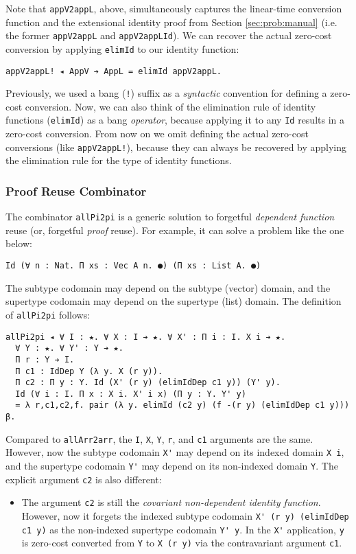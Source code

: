 \documentclass[acmsmall,screen]{acmart}
\newcommand{\refsec}[1]{Section \ref{sec:#1}}
\begin{document}
Note that \verb;appV2appL;, above, simultaneously captures the
linear-time conversion function and the extensional identity proof
from \refsec{prob:manual}
(i.e. the former \verb;appV2appL; and \verb;appV2appLId;).
We can recover the actual zero-cost
conversion by applying \verb;elimId; to our identity function:
\begin{verbatim}
appV2appL! ◂ AppV ➔ AppL = elimId appV2appL.
\end{verbatim}
Previously, we used a bang (\verb;!;) suffix as a \textit{syntactic} convention for
defining a zero-cost conversion. Now, we can also think of the elimination
rule of identity functions (\verb;elimId;) as a bang
\textit{operator}, because applying it to any \verb;Id; results in a
zero-cost conversion. From now on we omit defining the actual
zero-cost conversions (like \verb;appV2appL!;), because they can always
be recovered by applying the elimination rule for the type of identity
functions.

\subsubsection{Proof Reuse Combinator}

The combinator \verb;allPi2pi; is a generic solution to forgetful
\textit{dependent function} reuse (or, forgetful \textit{proof} reuse). For
example, it can solve a problem like the one below:
\begin{verbatim}
Id (∀ n : Nat. Π xs : Vec A n. ●) (Π xs : List A. ●)
\end{verbatim}
The subtype codomain may depend on the subtype (vector) domain, and
the supertype codomain may depend on the supertype (list) domain.
The definition of \verb;allPi2pi; follows:
\begin{verbatim}
allPi2pi ◂ ∀ I : ★. ∀ X : I ➔ ★. ∀ X' : Π i : I. X i ➔ ★. 
  ∀ Y : ★. ∀ Y' : Y ➔ ★.
  Π r : Y ➔ I.
  Π c1 : IdDep Y (λ y. X (r y)).
  Π c2 : Π y : Y. Id (X' (r y) (elimIdDep c1 y)) (Y' y).
  Id (∀ i : I. Π x : X i. X' i x) (Π y : Y. Y' y)
  = λ r,c1,c2,f. pair (λ y. elimId (c2 y) (f -(r y) (elimIdDep c1 y))) β.
\end{verbatim}
Compared to \verb;allArr2arr;, the \verb;I;, \verb;X;, \verb;Y;,
\verb;r;, and \verb;c1; arguments are the same. However, now the
subtype codomain \verb;X'; may depend on its indexed domain
\verb;X i;, and the supertype codomain \verb;Y'; may depend on its
non-indexed domain \verb;Y;. The explicit argument \verb;c2; is also
different:

\begin{itemize}
\item The argument \verb;c2; is still the \textit{covariant
  non-dependent identity function}. However, now it forgets the
  indexed subtype codomain \verb;X' (r y) (elimIdDep c1 y); as the
  non-indexed supertype codomain \verb;Y' y;. In the \verb;X';
  application, \verb;y; is zero-cost converted from \verb;Y; to
  \verb;X (r y); via the contravariant argument \verb;c1;.
\end{itemize}
\end{document}
